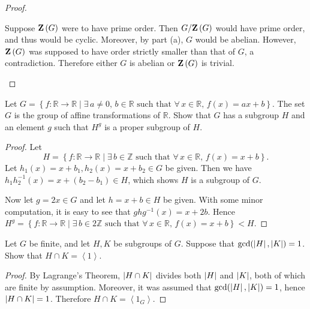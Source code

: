 \documentclass[10pt]{amsart}
\begin{document}
\begin{thm}
\begin{proof}
\begin{enumerate}[(a)]
			Suppose $\mathbf{Z}\left(G\right)$ were to have prime order.
			Then $G/\mathbf{Z}\left(G\right)$ would have prime order, and thus would be cyclic.
			Moreover, by part (a), $G$ would be abelian.
			However, $\mathbf{Z}\left(G\right)$ was supposed to have order strictly smaller than that of $G$, a contradiction.
			Therefore either $G$ is abelian or $\mathbf{Z}\left(G\right)$ is trivial.
			
	\end{enumerate}
  \end{proof}
\end{thm}
\begin{thm}
  Let $G = \left\{f \colon \mathbb{R} \rightarrow \mathbb{R} \mid \exists\, a \not = 0,\, b \in \mathbb{R} \text{ such that } \forall\, x\in \mathbb{R},\, f(x) = ax + b\right\}$.
  The set $G$ is the group of affine transformations of $\mathbb{R}$.  
  Show that $G$ has a subgroup $H$ and an element $g$ such that $H^{g}$ is a proper subgroup of $H$.
  \begin{proof}
	Let 
		$$H = \left\{ f \colon \mathbb{R} \rightarrow \mathbb{R} 
			\mid \exists\, b \in \mathbb{Z} \text{ such that } \forall\, x \in \mathbb{R},\, f(x) = x + b\right\}.$$ 
	Let $h_1(x) = x + b_1, h_2(x) = x + b_2 \in G$ be given.
	Then we have $h_1h_2^{-1}(x) = x + (b_2 - b_1)\in H$, which shows $H$ is a subgroup of $G$.
	
	Now let $g = 2x \in G$ and let $h = x + b \in H$ be given.
	With some minor computation, it is easy to see that $ghg^{-1}(x) = x + 2b$.
	Hence $H^{g} = \left\{ f \colon \mathbb{R} \rightarrow \mathbb{R} \mid \exists\, b \in 2\mathbb{Z} \text{ such that } \forall\, x \in \mathbb{R},\, f(x) = x+b\right\} < H$.
  \end{proof}
\end{thm}
\begin{thm}
  Let $G$ be finite, and let $H, K$ be subgroups of $G$.  Suppose that $\gcd(\left| H \right|, \left| K \right|) = 1$.
  Show that $H \cap K = \left<1\right>$.
  \begin{proof}
	By Lagrange's Theorem, $\left| H \cap K \right|$ divides both $\left| H \right|$ and $\left| K \right|$, both of which are finite by assumption.
	Moreover, it was assumed that $\gcd(\left| H \right|, \left| K \right|) = 1$, hence $\left| H \cap K \right| = 1$.
	Therefore $H \cap K = \left< 1_G\right>$.
  \end{proof}
\end{thm}
\end{document}
